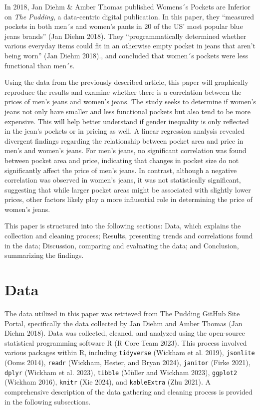 \documentclass[
  letterpaper,
  DIV=11,
  numbers=noendperiod]{scrartcl}
\begin{document}
In 2018, Jan Diehm \& Amber Thomas published Womens´s Pockets are
Inferior on \emph{The Pudding}, a data-centric digital publication. In
this paper, they ``measured pockets in both men´s and women's pants in
20 of the US' most popular blue jeans brands'' (Jan Diehm 2018). They
``programmatically determined whether various everyday items could fit
in an otherwise empty pocket in jeans that aren't being worn'' (Jan
Diehm 2018)., and concluded that women´s pockets were less functional
than men´s.

Using the data from the previously described article, this paper will
graphically reproduce the results and examine whether there is a
correlation between the prices of men's jeans and women's jeans. The
study seeks to determine if women's jeans not only have smaller and less
functional pockets but also tend to be more expensive. This will help
better understand if gender inequality is only reflected in the jean's
pockets or in pricing as well. A linear regression analysis revealed
divergent findings regarding the relationship between pocket area and
price in men's and women's jeans. For men's jeans, no significant
correlation was found between pocket area and price, indicating that
changes in pocket size do not significantly affect the price of men's
jeans. In contrast, although a negative correlation was observed in
women's jeans, it was not statistically significant, suggesting that
while larger pocket areas might be associated with slightly lower
prices, other factors likely play a more influential role in determining
the price of women's jeans.

This paper is structured into the following sections: Data, which
explains the collection and cleaning process; Results, presenting trends
and correlations found in the data; Discussion, comparing and evaluating
the data; and Conclusion, summarizing the findings.

\hypertarget{data}{%
\section{Data}\label{data}}

The data utilized in this paper was retrieved from The Pudding GitHub
Site Portal, specifically the data collected by Jan Diehm and Amber
Thomas (Jan Diehm 2018). Data was collected, cleaned, and analyzed using
the open-source statistical programming software R (R Core Team 2023).
This process involved various packages within R, including
\texttt{tidyverse} (Wickham et al. 2019), \texttt{jsonlite} (Ooms 2014),
\texttt{readr} (Wickham, Hester, and Bryan 2024), \texttt{janitor}
(Firke 2021), \texttt{dplyr} (Wickham et al. 2023), \texttt{tibble}
(Müller and Wickham 2023), \texttt{ggplot2} (Wickham 2016),
\texttt{knitr} (Xie 2024), and \texttt{kableExtra} (Zhu 2021). A
comprehensive description of the data gathering and cleaning process is
provided in the following subsections.
\end{document}
